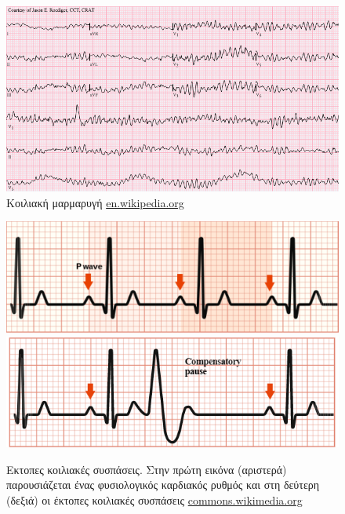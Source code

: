 \begin{itemize}
	\begin{figure}
		\centering
		\includegraphics[scale=0.3]{Ventricular_fibrillation.png}
		\caption{Κοιλιακή μαρμαρυγή \en \protect\url{en.wikipedia.org}}
	\end{figure}
	
	
	\begin{figure}[h]
		\centering
		\includegraphics[scale=0.4]{normal.png}
		\includegraphics[scale=0.38]{pvc.png}
		\caption{Εκτοπες κοιλιακές συσπάσεις. Στην πρώτη εικόνα (αριστερά) παρουσιάζεται ένας φυσιολογικός καρδιακός ρυθμός και στη δεύτερη (δεξιά) οι έκτοπες κοιλιακές συσπάσεις \en\protect\url{commons.wikimedia.org}}
	\end{figure}
\end{itemize}

